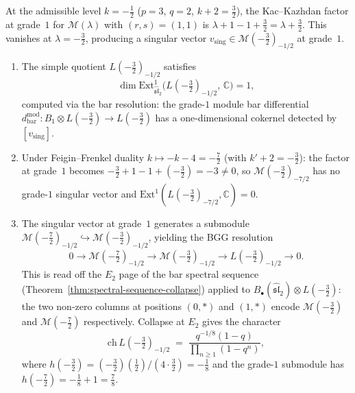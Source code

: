 \begin{example}
\label{ex:ext1-admissible-fractional}
At the admissible level $k = -\tfrac{1}{2}$
($p = 3$, $q = 2$, $k + 2 = \tfrac{3}{2}$),
the Kac--Kazhdan factor at grade~$1$
for $\mathcal{M}(\lambda)$ with $(r,s) = (1,1)$ is
$\lambda + 1 - 1 + \tfrac{3}{2} = \lambda + \tfrac{3}{2}$.
This vanishes at $\lambda = -\tfrac{3}{2}$, producing a singular
vector $v_{\mathrm{sing}} \in \mathcal{M}(-\tfrac{3}{2})_{-1/2}$
at grade~$1$.
\begin{enumerate}[label=\textup{(\roman*)}]
\item The simple quotient $L(-\tfrac{3}{2})_{-1/2}$ satisfies
  \begin{equation}\label{eq:ext1-fractional}
  \dim \mathrm{Ext}^1_{\widehat{\mathfrak{sl}}_2}
  \bigl(L(-\tfrac{3}{2})_{-1/2},\, \mathbb{C}\bigr) = 1,
  \end{equation}
  computed via the bar resolution: the grade-$1$ module bar
  differential
  $d^{\mathrm{mod}}_{\mathrm{bar}}\colon
  B_1 \otimes L(-\tfrac{3}{2}) \to L(-\tfrac{3}{2})$
  has a one-dimensional cokernel detected by
  $[v_{\mathrm{sing}}]$.

\item Under Feigin--Frenkel duality
  $k \mapsto -k - 4 = -\tfrac{7}{2}$
  (with $k' + 2 = -\tfrac{3}{2}$):
  the factor at grade~$1$ becomes
  $-\tfrac{3}{2} + 1 - 1 + (-\tfrac{3}{2}) = -3 \neq 0$,
  so $\mathcal{M}(-\tfrac{3}{2})_{-7/2}$ has no grade-$1$
  singular vector and
  $\mathrm{Ext}^1(L(-\tfrac{3}{2})_{-7/2}, \mathbb{C}) = 0$.

\item The singular vector at grade~$1$ generates a submodule
  $\mathcal{M}(-\tfrac{7}{2})_{-1/2} \hookrightarrow
  \mathcal{M}(-\tfrac{3}{2})_{-1/2}$, yielding the BGG resolution
  \begin{equation}\label{eq:bgg-admissible}
  0 \to \mathcal{M}(-\tfrac{7}{2})_{-1/2} \to
  \mathcal{M}(-\tfrac{3}{2})_{-1/2} \to
  L(-\tfrac{3}{2})_{-1/2} \to 0.
  \end{equation}
  This is read off the $E_2$ page of the bar spectral sequence
  (Theorem~\ref{thm:spectral-sequence-collapse}) applied to
  $B_\bullet(\widehat{\mathfrak{sl}}_2) \otimes L(-\tfrac{3}{2})$:
  the two non-zero columns at positions $(0, *)$ and $(1, *)$
  encode $\mathcal{M}(-\tfrac{3}{2})$ and
  $\mathcal{M}(-\tfrac{7}{2})$ respectively.  Collapse at $E_2$
  gives the character
  \begin{equation}\label{eq:admissible-character}
  \mathrm{ch}\, L(-\tfrac{3}{2})_{-1/2}
  \;=\;
  \frac{q^{-1/8}(1 - q)}{\prod_{n \geq 1}(1 - q^n)},
  \end{equation}
  where $h(-\tfrac{3}{2}) =
  (-\tfrac{3}{2})(\tfrac{1}{2})/(4 \cdot \tfrac{3}{2}) = -\tfrac{1}{8}$
  and the grade-$1$ submodule has $h(-\tfrac{7}{2}) = -\tfrac{1}{8}+1
  = \tfrac{7}{8}$.
\end{enumerate}
\end{example}

